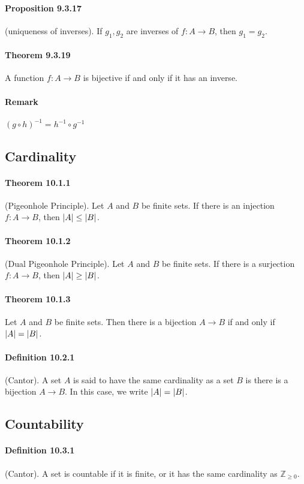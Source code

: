\documentclass[a4paper]{article}
\newcommand{\Z}{\mathbb{Z}}
\newcommand{\inv}{^{-1}}
\begin{document}
\begin{multicols*}{3}
      \paragraph{Proposition 9.3.17} (uniqueness of inverses). If $g_1, g_2$ are inverses of $f: A \rightarrow B$, then $g_1 = g_2$.
      \paragraph{Theorem 9.3.19} A function $f: A \rightarrow B$ is bijective if and only if it has an inverse.
      \paragraph{Remark} $(g \circ h) \inv = h \inv \circ g \inv$
  \subsection*{Cardinality}
    \paragraph{Theorem 10.1.1} (Pigeonhole Principle). Let $A$ and $B$ be finite sets. If there is an injection $f: A \rightarrow B$, then $\left\lvert A\right\rvert \leq \left\lvert B\right\rvert$.
    \paragraph{Theorem 10.1.2} (Dual Pigeonhole Principle). Let $A$ and $B$ be finite sets. If there is a surjection $f: A \rightarrow B$, then $\left\lvert A\right\rvert \geq \left\lvert B\right\rvert$.
    \paragraph{Theorem 10.1.3} Let $A$ and $B$ be finite sets. Then there is a bijection $A \rightarrow B$ if and only if $\left\lvert A\right\rvert = \left\lvert B\right\rvert$.
    \paragraph{Definition 10.2.1} (Cantor). A set $A$ is said to have the same cardinality as a set $B$ is there is a bijection $A \rightarrow B$. In this case, we write $\left\lvert A\right\rvert = \left\lvert B\right\rvert$.
    \subsection*{Countability}
      \paragraph{Definition 10.3.1} (Cantor). A set is countable if it is finite, or it has the same cardinality as $\Z_{\geq 0}$.

\end{multicols*}
\end{document}
